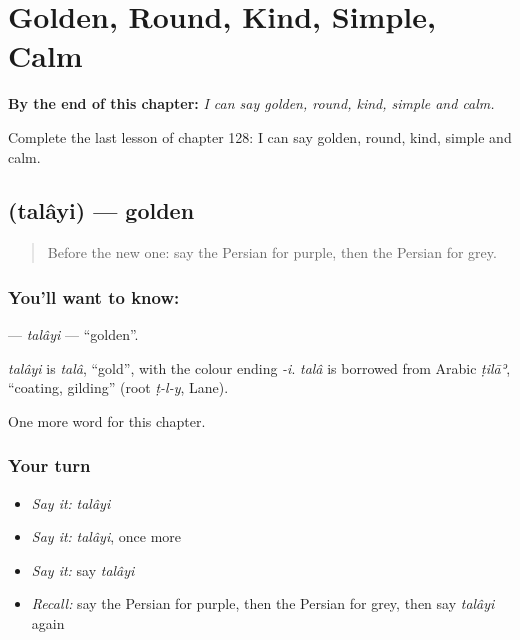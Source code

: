 
\chapter{Golden, Round, Kind, Simple, Calm}
\label{ch:fa-golden-round-kind-simple-calm}

\begin{chapteropening}
\textbf{By the end of this chapter:} \emph{I can say golden, round, kind, simple and calm.}

Complete the last lesson of chapter 128: I can say golden, round, kind, simple and calm.
\end{chapteropening}

\section[\texorpdfstring{\fa{طلایی} (talâyi)}{طلایی (talâyi)}]{ (talâyi) — golden}

\label{lesson:FA-C128-talayi}



\begin{quote}
Before the new one: say the Persian for purple, then the Persian for grey.
\end{quote}

\subsection*{You'll want to know: }
\textbf{} — \emph{talâyi} — \textquotedblleft{}golden\textquotedblright{}.

\begin{cousinweb}
\emph{talâyi} is \emph{talâ}, \textquotedblleft{}gold\textquotedblright{}, with the colour ending \emph{-i}. \emph{talâ} is borrowed from Arabic \emph{ṭilāʾ}, \textquotedblleft{}coating, gilding\textquotedblright{} (root \emph{ṭ-l-y}, Lane).
\end{cousinweb}

\begin{grammarlens}[title={What you've built}]
One more word for this chapter.
\end{grammarlens}

\subsection*{Your turn}
\begin{itemize}
\raggedright
  \item \emph{Say it:} \emph{talâyi}
  \item \emph{Say it:} \emph{talâyi}, once more
  \item \emph{Say it:} say \emph{talâyi}
  \item \emph{Recall:} say the Persian for purple, then the Persian for grey, then say \emph{talâyi} again
\end{itemize}


